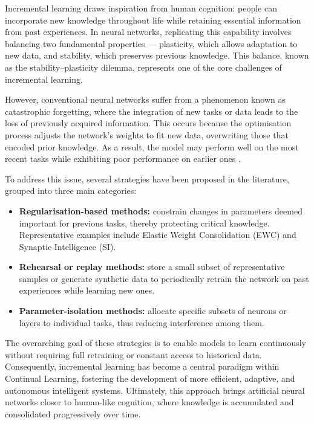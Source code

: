 Incremental learning draws inspiration from human cognition: people can incorporate new knowledge throughout life while retaining essential information from past experiences.  
In neural networks, replicating this capability involves balancing two fundamental properties — plasticity, which allows adaptation to new data, and stability, which preserves previous knowledge.  
This balance, known as the stability–plasticity dilemma, represents one of the core challenges of incremental learning.

However, conventional neural networks suffer from a phenomenon known as catastrophic forgetting, where the integration of new tasks or data leads to the loss of previously acquired information.  
This occurs because the optimisation process adjusts the network’s weights to fit new data, overwriting those that encoded prior knowledge.  
As a result, the model may perform well on the most recent tasks while exhibiting poor performance on earlier ones \cite{liu2015}.

To address this issue, several strategies have been proposed in the literature, grouped into three main categories:

\begin{itemize}
    \item \textbf{Regularisation-based methods:} constrain changes in parameters deemed important for previous tasks, thereby protecting critical knowledge.  
    Representative examples include Elastic Weight Consolidation (EWC) and Synaptic Intelligence (SI).

    \item \textbf{Rehearsal or replay methods:} store a small subset of representative samples or generate synthetic data to periodically retrain the network on past experiences while learning new ones.

    \item \textbf{Parameter-isolation methods:} allocate specific subsets of neurons or layers to individual tasks, thus reducing interference among them.
\end{itemize}

The overarching goal of these strategies is to enable models to learn continuously without requiring full retraining or constant access to historical data.  
Consequently, incremental learning has become a central paradigm within Continual Learning, fostering the development of more efficient, adaptive, and autonomous intelligent systems.  
Ultimately, this approach brings artificial neural networks closer to human-like cognition, where knowledge is accumulated and consolidated progressively over time.

